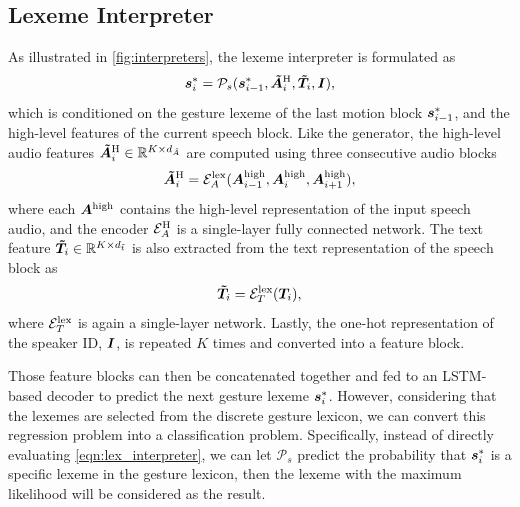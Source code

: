 \subsection{Lexeme Interpreter}
\label{subsec:lexeme_interpreter}
As illustrated in \fig\ref{fig:interpreters}, the lexeme interpreter is formulated as
\begin{equation}
    \bm{s}_i^*=\mathcal{P}_s(\bm{s}_{i-1}^*, \bm{\tilde{A}}_i^{{\text{H}}}, \bm{\tilde{T}}_i, \bm{I}), 
    \label{eqn:lex_interpreter}
\end{equation}
which is conditioned on the gesture lexeme of the last motion block $\bm{s}_{i-1}^*$, and the high-level features of the current speech block. Like the generator, the high-level audio features $\bm{\tilde{A}}_i^{{\text{H}}}\in\mathbb{R}^{K\times{}d_{\tilde{A}}}$ are computed using three consecutive audio blocks
\begin{equation}
    \bm{\tilde{A}}_i^{{\text{H}}}=\mathcal{E}_A^{{\text{lex}}}(\bm{A}^{{\text{high}}}_{i-1},\bm{A}^{{\text{high}}}_{i},\bm{A}^{{\text{high}}}_{i+1}),
\end{equation}
where each $\bm{A}^{{\text{high}}}$ contains the high-level representation of the input speech audio, and the encoder $\mathcal{E}_A^{{\text{H}}}$ is a single-layer fully connected network. 
%
The text feature $\bm{\tilde{T}}_i\in\mathbb{R}^{K\times{}d_{\tilde{t}}}$ is also extracted from the text representation of the speech block as 
\begin{equation}
    \bm{\tilde{T}}_i=\mathcal{E}_T^{{\text{lex}}}(\bm{T}_i),
\end{equation}
where $\mathcal{E}_T^{{\text{lex}}}$ is again a single-layer network. %
%
Lastly, the one-hot representation of the speaker ID, $\bm{I}$, is repeated $K$ times and converted into a feature block.

Those feature blocks can then be concatenated together and fed to an LSTM-based decoder to predict the next gesture lexeme $\bm{s}_i^*$. However, considering that the lexemes are selected from the discrete gesture lexicon, we can convert this regression problem into a classification problem. Specifically, instead of directly evaluating \eqn\eqref{eqn:lex_interpreter}, we can let $\mathcal{P}_s$ predict the probability that $\bm{s}_i^*$ is a specific lexeme in the gesture lexicon, then the lexeme with the maximum likelihood will be considered as the result.

